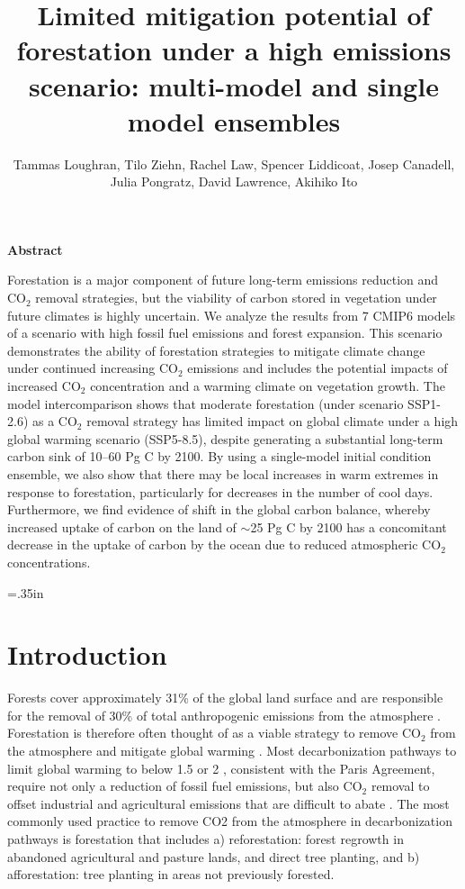 \documentclass[]{article}
\title{Limited mitigation potential of forestation under a high emissions scenario: multi-model and single model ensembles}
\author{Tammas Loughran, Tilo Ziehn, Rachel Law, Spencer Liddicoat, Josep Canadell, Julia Pongratz, David Lawrence, Akihiko Ito}
\begin{document}
\maketitle

\begin{center}
    \Large
    \vspace{0.9cm}
    \textbf{Abstract}
\end{center}

Forestation is a major component of future long-term emissions reduction and CO$_2$ removal strategies, but the viability of carbon stored in vegetation under future climates is highly uncertain.
We analyze the results from 7 CMIP6 models of a scenario with high fossil fuel emissions and forest expansion.
This scenario demonstrates the ability of forestation strategies to mitigate climate change under continued increasing CO$_2$ emissions and includes the potential impacts of increased CO$_2$ concentration and a warming climate on vegetation growth.
The model intercomparison shows that moderate forestation (under scenario SSP1-2.6)  as a CO$_2$ removal strategy has limited impact on global climate under a high global warming scenario (SSP5-8.5), despite generating a substantial long-term carbon sink of 10--60 Pg C by 2100.
By using a single-model initial condition ensemble, we also show that there may be local increases in warm extremes in response to forestation, particularly for decreases in the number of cool days.
Furthermore, we find evidence of shift in the global carbon balance, whereby increased uptake of carbon on the land of $\sim$25 Pg C by 2100 has a concomitant decrease in the uptake of carbon by the ocean due to reduced atmospheric CO$_2$ concentrations.

\raggedright
\parindent=.35in %

\section{Introduction}

Forests cover approximately 31\% of the global land surface \parencite{luyssaert_land_2014,fao_global_2020} and are responsible for the removal of 30\% of total anthropogenic emissions from the atmosphere \parencite{friedlingstein_global_2022}.
Forestation is therefore often thought of as a viable strategy to remove CO$_2$ from the atmosphere and mitigate global warming \parencite{house_maximum_2002, griscom_natural_2017, smith_long-term_2022}.
Most decarbonization pathways to limit global warming to below 1.5 or 2 \textcelsius{}, consistent with the Paris Agreement, require not only a reduction of fossil fuel emissions, but also CO$_2$ removal to offset industrial and agricultural emissions that are difficult to abate \parencite{babiker_crosssectoral_2022}.
The most commonly used practice to remove CO2 from the atmosphere in decarbonization pathways is forestation that includes a) reforestation: forest regrowth in abandoned agricultural and pasture lands, and direct tree planting, and b) afforestation: tree planting in areas not previously forested.
\end{document}
